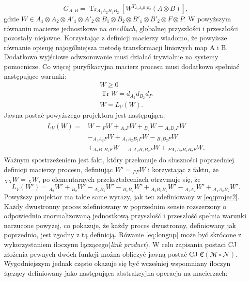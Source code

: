 \documentclass[10pt]{article} %
\DeclareMathOperator{\Trs}{Tr}
\newcommand{\MCJ}{\mathfrak{C}}
\begin{document}
\begin{equation}
\label{eq:longnp}
G_{A,B} = \Trs_{A_1A_2B_1B_2} \left[ W^{T_{A_1A_2B_1B_2}} (A\otimes B)\right],
\end{equation}
gdzie $W \in A_1 \otimes A_2 \otimes A'_1 \otimes A'_2 \otimes B_1 \otimes B_2 \otimes B'_1 \otimes B'_2 \otimes F \otimes P$. W powyższym równaniu macierze jednostkowe na \textit{ancillach}, globalnej przyszłości i przeszłości pozostały niejawne.
Korzystając z definicji macierzy wiadomo, że powyższe równanie opisuję najogólniejsza metodę transformacji liniowych map A i B. Dodatkowo wyjściowe odwzorowanie musi działać trywialnie na systemy pomocnicze. Co więcej puryfikacyjna macierz procesu musi dodatkowo spełniać następujące warunki:
\begin{gather}
W \geq 0 \\
\Trs W = d_{A_2}d_{B_2}d_P \\
W = L_V(W).
\end{gather} 
Jawna postać powyższego projektora jest następująca:
\begin{align}
\begin{split}
L_V(W) =& W -{}_FW + {}_{A_2F}W + {}_{B_2}W - {}_{A_2B_2F}W\\ &- {}_{A_1A_2F}W + {}_{A_1A_2B_2F}W - {}_{B_1B_2F}W \\&+ {}_{A_2B_1B_2F}W - {}_{A_1A_2B_1B_2F}W + {}_{PA_1A_2B_1B_2F}W.
\end{split}
\end{align}
Ważnym spostrzeżeniem jest fakt, który przekonuje do słuszności poprzedniej definicji macierzy procesu, definiując $W' = {}_{PF}W$ i korzystając z faktu, że
${}_{XX}W = {}_{X}W$, po elementarnych przekształceniach otrzymuje się, że
\begin{equation}
L_V(W') = {}_{A_2}W' + {}_{B_2}W' - {}_{A_2B_2}W' - {}_{B_1B_2}W' + {}_{A_2B_1B_2}W' - {}_{A_1A_2}W' + {}_{A_1A_2B_2}W'.
\end{equation}
Powyższy projektor ma takie same wyrazy, jak ten zdefiniowany w \eqref{eq:projec2}.
Każdy dwustronny proces zdefiniowany w poprzednim sensie rozszerzony o odpowiednio znormalizowaną jednostkową przyszłość i przeszłość spełnia warunki narzucone powyżej, co pokazuje, że każdy proces dwustronny, definiowany jak poprzednio, jest zgodny z tą definicją.
Rówanie \eqref{eq:longnp} może być skrócone z wykorzystaniem iloczynu łączącego(\textit{link product}).
W celu zapisania postaci CJ złożenia pewnych dwóch funkcji można obliczyć jawną postać CJ $\MCJ(\mathcal{M} \circ \mathcal{N})$. Wygodniejszym
jednak często okazuje się być wcześniej wspomniany iloczyn łączący definiowany jako następująca abstrakcyjna operacja na macierzach:
\end{document}
